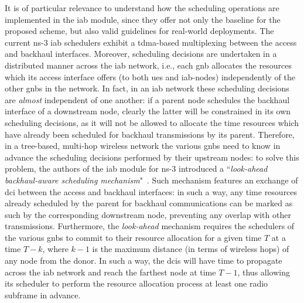 It is of particular relevance to understand how the scheduling operations are implemented in the \gls{iab} module, since they offer not only the baseline for the proposed scheme, but also valid guidelines for real-world deployments. 
The current ns-3 \gls{iab} schedulers exhibit a \gls{tdma}-based multiplexing between the access and backhaul interfaces. Moreover, scheduling decisions are undertaken in a distributed manner across the \gls{iab} network, i.e., each \gls{gnb} allocates the resources which its access interface offers (to both \gls{ue}s and  \gls{iab}-nodes) independently of the other \gls{gnb}s in the network. 
In fact, in an \gls{iab} network these scheduling decisions are \textit{almost} independent of one another: if a parent node schedules the backhaul interface of a downstream node, clearly the latter will be constrained in its own scheduling decisions, as it will not be allowed to allocate the time resources which have already been scheduled for backhaul transmissions by its parent. Therefore, in a tree-based, multi-hop wireless network the various \glspl{gnb} need to know in advance the scheduling decisions performed by their upstream nodes: to solve this problem, the authors of the \gls{iab} module for ns-3 introduced a ``\textit{look-ahead backhaul-aware scheduling mechanism}"~\cite{polese2018end}. 
Such mechanism features an exchange of \gls{dci} between the access and backhaul interfaces: in such a way, any time resources already scheduled by the parent for backhaul communications can be marked as such by the corresponding downstream node, preventing any overlap with other transmissions.
Furthermore, the \textit{look-ahead} mechanism requires the schedulers of the various \gls{gnb}s to commit to their resource allocation for a given time $T$ at a time $T - k$, where $k - 1$ is the maximum distance (in terms of wireless hops) of any node from the donor. In such a way, the \gls{dci}s will have time to propagate across the \gls{iab} network and reach the farthest node at time $T - 1$, thus allowing its scheduler to perform the resource allocation process at least one radio subframe in advance. 

